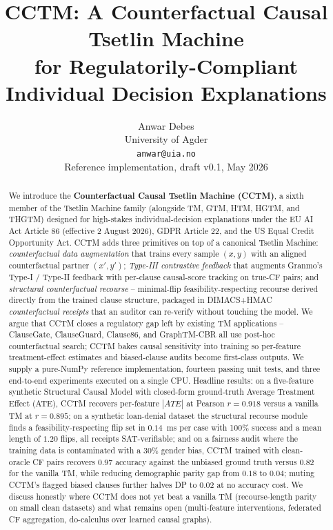 \documentclass[11pt]{article}
\title{\textbf{CCTM: A Counterfactual Causal Tsetlin Machine\\for Regulatorily-Compliant Individual Decision Explanations}}
\author{Anwar Debes\\
University of Agder \\
\texttt{anwar@uia.no}\\
\vspace{0.5em}
\small Reference implementation, draft v0.1, May 2026
}
\date{}
\begin{document}
\maketitle

\begin{abstract}
We introduce the \textbf{Counterfactual Causal Tsetlin Machine (CCTM)}, a sixth member of the Tsetlin Machine family (alongside TM, GTM, HTM, HGTM, and THGTM) designed for high-stakes individual-decision explanations under the EU AI Act Article 86 (effective 2 August 2026), GDPR Article 22, and the US Equal Credit Opportunity Act.  CCTM adds three primitives on top of a canonical Tsetlin Machine: \emph{counterfactual data augmentation} that trains every sample $(x, y)$ with an aligned counterfactual partner $(x', y')$; \emph{Type-III contrastive feedback} that augments Granmo's Type-I / Type-II feedback with per-clause causal-score tracking on true-CF pairs; and \emph{structural counterfactual recourse} -- minimal-flip feasibility-respecting recourse derived directly from the trained clause structure, packaged in DIMACS+HMAC \emph{counterfactual receipts} that an auditor can re-verify without touching the model.  We argue that CCTM closes a regulatory gap left by existing TM applications -- ClauseGate, ClauseGuard, Clause86, and GraphTM-CBR all use post-hoc counterfactual search; CCTM bakes causal sensitivity into training so per-feature treatment-effect estimates and biased-clause audits become first-class outputs.  We supply a pure-NumPy reference implementation, fourteen passing unit tests, and three end-to-end experiments executed on a single CPU.  Headline results: on a five-feature synthetic Structural Causal Model with closed-form ground-truth Average Treatment Effect (ATE), CCTM recovers per-feature $|ATE|$ at Pearson $r = 0.918$ versus a vanilla TM at $r = 0.895$; on a synthetic loan-denial dataset the structural recourse module finds a feasibility-respecting flip set in $0.14$~ms per case with 100\% success and a mean length of $1.20$ flips, all receipts SAT-verifiable; and on a fairness audit where the training data is contaminated with a 30\% gender bias, CCTM trained with clean-oracle CF pairs recovers $0.97$ accuracy against the unbiased ground truth versus $0.82$ for the vanilla TM, while reducing demographic parity gap from $0.18$ to $0.04$; muting CCTM's flagged biased clauses further halves DP to $0.02$ at no accuracy cost.  We discuss honestly where CCTM does not yet beat a vanilla TM (recourse-length parity on small clean datasets) and what remains open (multi-feature interventions, federated CF aggregation, do-calculus over learned causal graphs).
\end{abstract}
\end{document}

